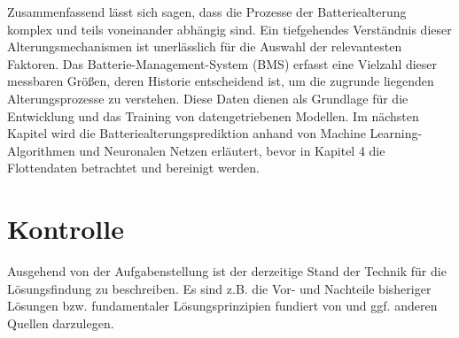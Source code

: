 Zusammenfassend lässt sich sagen, dass die Prozesse der Batteriealterung komplex und teils voneinander abhängig sind. Ein tiefgehendes Verständnis dieser Alterungsmechanismen ist unerlässlich für die Auswahl der relevantesten Faktoren. Das Batterie-Management-System (BMS) erfasst eine Vielzahl dieser messbaren Größen, deren Historie entscheidend ist, um die zugrunde liegenden Alterungsprozesse zu verstehen. Diese Daten dienen als Grundlage für die Entwicklung und das Training von datengetriebenen Modellen. Im nächsten Kapitel wird die Batteriealterungsprediktion anhand von Machine Learning-Algorithmen und Neuronalen Netzen erläutert, bevor in Kapitel 4 die Flottendaten betrachtet und bereinigt werden.


\section{Kontrolle}
Ausgehend von der Aufgabenstellung ist der derzeitige Stand der Technik für die Lösungsfindung zu beschreiben. Es sind z.B. die Vor- und Nachteile bisheriger Lösungen bzw. fundamentaler Lösungsprinzipien fundiert von und ggf. anderen Quellen darzulegen.